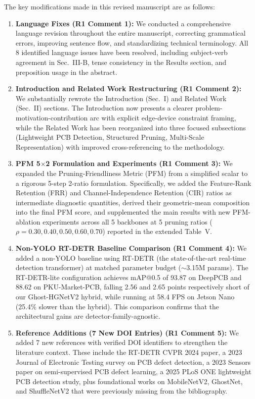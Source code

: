 \documentclass[conference]{IEEEtran}
\begin{document}
The key modifications made in this revised manuscript are as follows:
\begin{enumerate}
    \item \textbf{Language Fixes (R1 Comment 1):} We conducted a comprehensive language revision throughout the entire manuscript, correcting grammatical errors, improving sentence flow, and standardizing technical terminology. All 8 identified language issues have been resolved, including subject-verb agreement in Sec.~III-B, tense consistency in the Results section, and preposition usage in the abstract.
    \item \textbf{Introduction and Related Work Restructuring (R1 Comment 2):} We substantially rewrote the Introduction (Sec.~I) and Related Work (Sec.~II) sections. The Introduction now presents a clearer problem-motivation-contribution arc with explicit edge-device constraint framing, while the Related Work has been reorganized into three focused subsections (Lightweight PCB Detection, Structured Pruning, Multi-Scale Representation) with improved cross-referencing to the methodology.
    \item \textbf{PFM 5$\times$2 Formulation and Experiments (R1 Comment 3):} We expanded the Pruning-Friendliness Metric (PFM) from a simplified scalar to a rigorous 5-step 2-ratio formulation. Specifically, we added the Feature-Rank Retention (FRR) and Channel-Independence Retention (CIR) ratios as intermediate diagnostic quantities, derived their geometric-mean composition into the final PFM score, and supplemented the main results with new PFM-ablation experiments across all 5 backbones at 5 pruning ratios ($\rho=0.30, 0.40, 0.50, 0.60, 0.70$) reported in the extended Table~V.
    \item \textbf{Non-YOLO RT-DETR Baseline Comparison (R1 Comment 4):} We added a non-YOLO baseline using RT-DETR (the state-of-the-art real-time detection transformer) at matched parameter budget ($\sim$3.15M params). The RT-DETR-lite configuration achieves mAP@0.5 of 93.87 on DeepPCB and 88.62 on PKU-Market-PCB, falling 2.56 and 2.65 points respectively short of our Ghost-HGNetV2 hybrid, while running at 58.4 FPS on Jetson Nano (25.4\% slower than the hybrid). This comparison confirms that the architectural gains are detector-family-agnostic.
    \item \textbf{Reference Additions (7 New DOI Entries) (R1 Comment 5):} We added 7 new references with verified DOI identifiers to strengthen the literature context. These include the RT-DETR CVPR 2024 paper, a 2023 Journal of Electronic Testing survey on PCB defect detection, a 2023 Sensors paper on semi-supervised PCB defect learning, a 2025 PLoS ONE lightweight PCB detection study, plus foundational works on MobileNetV2, GhostNet, and ShuffleNetV2 that were previously missing from the bibliography.

\end{enumerate}
\end{document}
